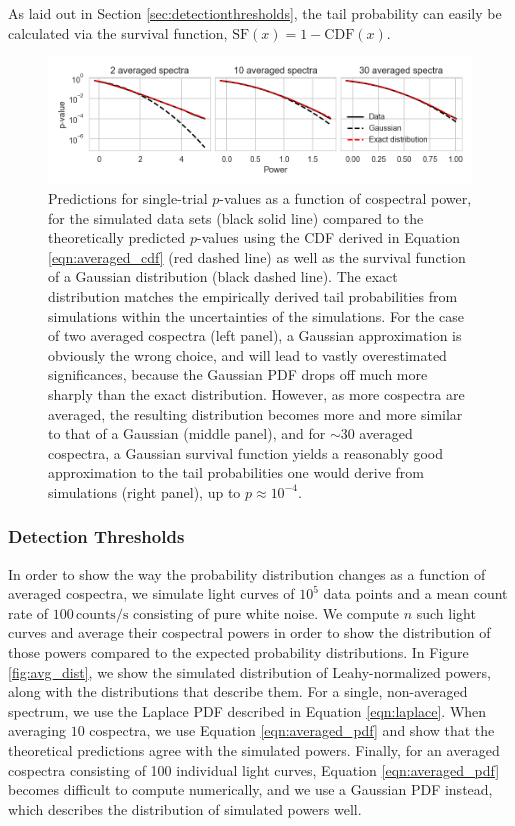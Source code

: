 \documentclass[12pt]{emulateapj}
\begin{document}
\noindent As laid out in Section \ref{sec:detectionthresholds}, the tail probability can easily be calculated via the survival function, $\mathrm{SF}(x) = 1 - \mathrm{CDF}(x)$. 


\begin{figure}
\begin{center}
\includegraphics[width=\textwidth]{../figs/avg_pvalues.png}
\caption{Predictions for single-trial $p$-values as a function of cospectral power, for the simulated data sets (black solid line) compared to the theoretically predicted $p$-values using the CDF derived in Equation \ref{eqn:averaged_cdf} (red dashed line) as well as the survival function of a Gaussian distribution (black dashed line). The exact distribution matches the empirically derived tail probabilities from simulations within the uncertainties of the simulations. For the case of two averaged cospectra (left panel), a Gaussian approximation is obviously the wrong choice, and will lead to vastly overestimated significances, because the Gaussian PDF drops off much more sharply than the exact distribution. However, as more cospectra are averaged, the resulting distribution becomes more and more similar to that of a Gaussian (middle panel), and for $\sim$30 averaged cospectra, a Gaussian survival function yields a reasonably good approximation to the tail probabilities one would derive from simulations (right panel), up to $p \approx 10^{-4}$.}
\label{fig:avg_pvalue}
\end{center}
\end{figure}

\subsubsection{Detection Thresholds}
\label{sec:averaged_detthres}

In order to show the way the probability distribution changes as a function of averaged cospectra, we simulate light curves of $10^{5}$ data points and a mean count rate of $100\,\mathrm{counts}/\mathrm{s}$ consisting of pure white noise. We compute $n$ such light curves and average their cospectral powers in order to show the distribution of those powers compared to the expected probability distributions. In Figure \ref{fig:avg_dist}, we show the simulated distribution of Leahy-normalized powers, along with the distributions that describe them. For a single, non-averaged spectrum, we use the Laplace PDF described in Equation \ref{eqn:laplace}. When averaging $10$ cospectra, we use Equation \ref{eqn:averaged_pdf} and show that the theoretical predictions agree with the simulated powers. Finally, for an averaged cospectra consisting of 100 individual light curves, Equation \ref{eqn:averaged_pdf} becomes difficult to compute numerically, and we use a Gaussian PDF instead, which describes the distribution of simulated powers well. 
\end{document}
